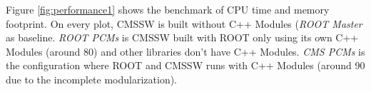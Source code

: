 \documentclass[12pt]{iopart}
\begin{document}
Figure \ref{fig:performance1} shows the benchmark of CPU time and memory footprint. On every plot, CMSSW is built without C++ Modules (\textit{ROOT Master} as baseline. \textit{ROOT PCMs} is CMSSW built with ROOT only using its own C++ Modules (around 80) and other libraries don't have C++ Modules. \textit{CMS PCMs} is the configuration where ROOT and CMSSW runs with C++ Modules (around 90 due to the incomplete modularization).

\begin{figure}[h]
\centering
\begin{minipage}{.48\textwidth}
\end{minipage}\hfill
\begin{minipage}{.48\textwidth}

\end{minipage}
\end{figure}
\end{document}

